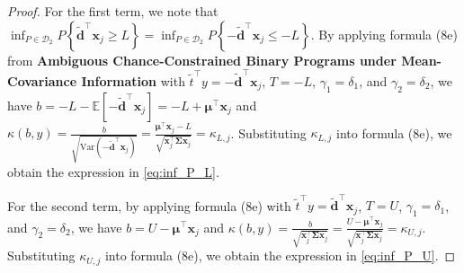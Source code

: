 \documentclass[preprint,12pt,authoryear]{elsarticle}
\begin{document}
\begin{proof}
For the first term, we note that $\inf_{P \in \mathcal{D}_{2}} P\left\{ \widetilde{\mathbf{d}}^{\top} \mathbf{x}_{j} \geqslant L \right\} = \inf_{P \in \mathcal{D}_{2}} P\left\{ -\widetilde{\mathbf{d}}^{\top} \mathbf{x}_{j} \leqslant -L \right\}$. By applying formula (8e) from \textbf{Ambiguous Chance-Constrained Binary Programs under Mean-Covariance Information} with $\tilde{t}^{\top} y = -\widetilde{\mathbf{d}}^{\top} \mathbf{x}_{j}$, $T = -L$, $\gamma_1 = \delta_1$, and $\gamma_2 = \delta_2$, we have $b = -L - \mathbb{E}[-\widetilde{\mathbf{d}}^{\top} \mathbf{x}_{j}] = -L + \boldsymbol{\mu}^{\top} \mathbf{x}_{j}$ and $\kappa(b,y) = \frac{b}{\sqrt{\text{Var}(-\widetilde{\mathbf{d}}^{\top} \mathbf{x}_{j})}} = \frac{\boldsymbol{\mu}^{\top} \mathbf{x}_{j} - L}{\sqrt{\mathbf{x}_{j}^{\top} \boldsymbol{\Sigma} \mathbf{x}_{j}}} = \kappa_{L,j}$. Substituting $\kappa_{L,j}$ into formula (8e), we obtain the expression in \eqref{eq:inf_P_L}.

For the second term, by applying formula (8e) with $\tilde{t}^{\top} y = \widetilde{\mathbf{d}}^{\top} \mathbf{x}_{j}$, $T = U$, $\gamma_1 = \delta_1$, and $\gamma_2 = \delta_2$, we have $b = U - \boldsymbol{\mu}^{\top} \mathbf{x}_{j}$ and $\kappa(b,y) = \frac{b}{\sqrt{\mathbf{x}_{j}^{\top} \boldsymbol{\Sigma} \mathbf{x}_{j}}} = \frac{U - \boldsymbol{\mu}^{\top} \mathbf{x}_{j}}{\sqrt{\mathbf{x}_{j}^{\top} \boldsymbol{\Sigma} \mathbf{x}_{j}}} = \kappa_{U,j}$. Substituting $\kappa_{U,j}$ into formula (8e), we obtain the expression in \eqref{eq:inf_P_U}.
\end{proof}
\end{document}
